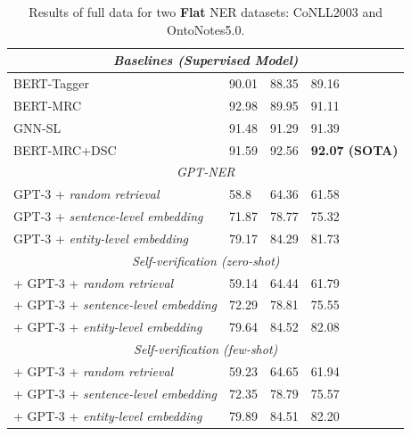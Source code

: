 \documentclass[11pt]{article}
\begin{document}
\begin{table}[th!]
{\begin{tabular}{llll}
        \multicolumn{4}{c}{{\it Baselines (Supervised Model)}} \\\midrule
        BERT-Tagger \citep{devlin2018bert} & 90.01 & 88.35 & 89.16 \\
        BERT-MRC \citep{li2019unified} & 92.98 & 89.95 & 91.11 \\
        GNN-SL \citep{wang2022gnn} & 91.48 & 91.29  & 91.39 \\
        BERT-MRC+DSC \cite{li2019dice} & 91.59 & 92.56 & \textbf{92.07 (SOTA)} \\\midrule
        \multicolumn{4}{c}{{\it GPT-NER}} \\\midrule
        GPT-3 + \textit{random retrieval} & 58.8 & 64.36 & 61.58 \\
        GPT-3 + \textit{sentence-level embedding} & 71.87 & 78.77 & 75.32 \\
        GPT-3 + \textit{entity-level embedding} & 79.17 & 84.29 & 81.73 \\\midrule
        \multicolumn{4}{c}{{\it Self-verification (zero-shot)}} \\\midrule
        + GPT-3 + \textit{random retrieval} & 59.14 & 64.44 & 61.79 \\
        + GPT-3 + \textit{sentence-level embedding} & 72.29 & 78.81 & 75.55 \\
        + GPT-3 + \textit{entity-level embedding} & 79.64 & 84.52 & 82.08 \\\midrule
        \multicolumn{4}{c}{{\it Self-verification (few-shot)}} \\\midrule
        + GPT-3 + \textit{random retrieval} & 59.23 & 64.65 & 61.94 \\
        + GPT-3 + \textit{sentence-level embedding} & 72.35 & 78.79 & 75.57 \\
        + GPT-3 + \textit{entity-level embedding} & 79.89 & 84.51 & 82.20 \\\bottomrule
    \end{tabular}
    }
     \caption{Results of full data for two \textbf{Flat} NER datasets: CoNLL2003 and OntoNotes5.0.}
    \label{tab:ner_result}
\end{table}
\end{document}
